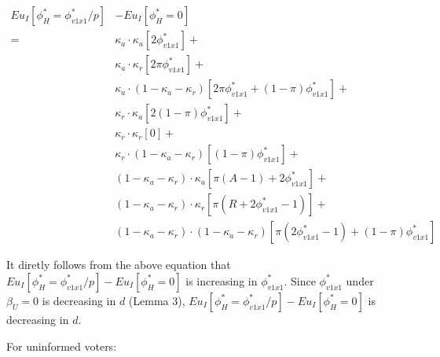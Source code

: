 \begin{align*}
	Eu_I[\phi^*_H = \phi^*_{v1x1}/p] &- Eu_I[\phi^*_H = 0]\\
	=& \kappa_a \cdot \kappa_a [ 2\phi^*_{v1x1}] + \\
	&\kappa_a \cdot \kappa_r [ 2 \pi \phi^*_{v1x1} ] + \\
	&\kappa_a \cdot (1-\kappa_a-\kappa_r) [ 2 \pi \phi^*_{v1x1} + (1-\pi)\phi^*_{v1x1}] + \\
	&\kappa_r \cdot \kappa_a [ 2(1-\pi)\phi^*_{v1x1} ] + \\
	&\kappa_r \cdot \kappa_r [ 0 ] + \\
	&\kappa_r \cdot (1-\kappa_a-\kappa_r) [ (1-\pi)\phi^*_{v1x1}] + \\
	&(1-\kappa_a-\kappa_r) \cdot \kappa_a [ \pi (A-1) + 2\phi^*_{v1x1} ] + \\
	&(1-\kappa_a-\kappa_r) \cdot \kappa_r [ \pi (R+2\phi^*_{v1x1}-1)  ] + \\
	&(1-\kappa_a-\kappa_r) \cdot (1-\kappa_a-\kappa_r) [ \pi (2\phi^*_{v1x1}-1) + (1-\pi)\phi^*_{v1x1} ] 
\end{align*}

\noindent It diretly follows from the above equation that $Eu_I[\phi^*_H = \phi^*_{v1x1}/p] - Eu_I[\phi^*_H = 0]$ is increasing in $\phi^*_{v1x1}$. Since $\phi^*_{v1x1}$ under $\beta_U=0$ is decreasing in $d$ (Lemma 3), $Eu_I[\phi^*_H = \phi^*_{v1x1}/p] - Eu_I[\phi^*_H = 0]$ is decreasing in $d$.

\par For uninformed voters:

